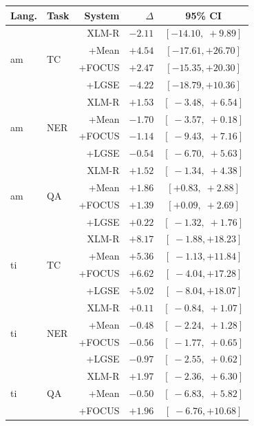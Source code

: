 \documentclass[11pt]{article}
\begin{document}
\begin{table}[t]
\centering
\small
\begin{tabular}{llrrc}
\toprule
Lang. & Task & System & $\Delta$ & 95\% CI \\
\midrule
\multirow{4}{*}{am}
 & \multirow{4}{*}{TC}
            & XLM-R & $-2.11$ & $[-14.10, \;+9.89]$ \\
 & & +Mean  & $+4.54$ & $[-17.61, +26.70]$ \\
 & & +FOCUS & $+2.47$ & $[-15.35, +20.30]$ \\
 & & +LGSE  & $-4.22$ & $[-18.79, +10.36]$ \\
\midrule
\multirow{4}{*}{am}
 & \multirow{4}{*}{NER}
            & XLM-R & $+1.53$ & $[\;-3.48, \;+6.54]$ \\
 & & +Mean  & $-1.70$ & $[\;-3.57, \;+0.18]$ \\
 & & +FOCUS & $-1.14$ & $[\;-9.43, \;+7.16]$ \\
 & & +LGSE  & $-0.54$ & $[\;-6.70, \;+5.63]$ \\
\midrule
\multirow{4}{*}{am}
 & \multirow{4}{*}{QA}
            & XLM-R & $+1.52$ & $[\;-1.34, \;+4.38]$ \\
 & & +Mean  & $+1.86$ & $\mathbf{[+0.83, \;+2.88]}$ \\
 & & +FOCUS & $+1.39$ & $\mathbf{[+0.09, \;+2.69]}$ \\
 & & +LGSE  & $+0.22$ & $[\;-1.32, \;+1.76]$ \\
\midrule
\multirow{4}{*}{ti}
 & \multirow{4}{*}{TC}
            & XLM-R & $+8.17$ & $[\;-1.88, +18.23]$ \\
 & & +Mean  & $+5.36$ & $[\;-1.13, +11.84]$ \\
 & & +FOCUS & $+6.62$ & $[\;-4.04, +17.28]$ \\
 & & +LGSE  & $+5.02$ & $[\;-8.04, +18.07]$ \\
\midrule
\multirow{4}{*}{ti}
 & \multirow{4}{*}{NER}
            & XLM-R & $+0.11$ & $[\;-0.84, \;+1.07]$ \\
 & & +Mean  & $-0.48$ & $[\;-2.24, \;+1.28]$ \\
 & & +FOCUS & $-0.56$ & $[\;-1.77, \;+0.65]$ \\
 & & +LGSE  & $-0.97$ & $[\;-2.55, \;+0.62]$ \\
\midrule
\multirow{4}{*}{ti}
 & \multirow{4}{*}{QA}
            & XLM-R & $+1.97$ & $[\;-2.36, \;+6.30]$ \\
 & & +Mean  & $-0.50$ & $[\;-6.83, \;+5.82]$ \\
 & & +FOCUS & $+1.96$ & $[\;-6.76, +10.68]$ \\

\end{tabular}
\end{table}
\end{document}

